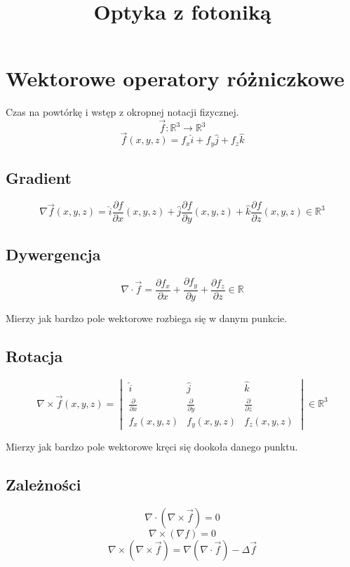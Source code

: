 \documentclass{../notatki}
\title{Optyka z fotoniką}
\begin{document}
\section{Wektorowe operatory różniczkowe}

Czas na powtórkę i wstęp z okropnej notacji fizycznej.
$$
\vec{f}: \mathbb{R}^3 \to \mathbb{R}^3
$$
$$
\vec{f}(x, y, z) = f_x \hat{i} + f_y \hat{j} + f_z \hat{k}
$$

\subsection{Gradient}

$$
\nabla \vec{f}(x, y, z) =
\hat{i} \frac{\partial f}{\partial x}(x, y,z) +
\hat{j} \frac{\partial f}{\partial y}(x, y, z) +
\hat{k} \frac{\partial f}{\partial z}(x, y, z)
\in \mathbb{R}^3
$$

\subsection{Dywergencja}

$$
\nabla \cdot \vec{f} = \frac{\partial f_x}{\partial x} + \frac{\partial
f_y}{\partial y} + \frac{\partial f_z}{\partial z}
\in \mathbb{R}
$$

Mierzy jak bardzo pole wektorowe rozbiega się w danym punkcie.

\subsection{Rotacja}

$$
\nabla \times \vec{f}(x, y, z) =
\begin{vmatrix}
  \hat{i} & \hat{j} & \hat{k} \\
  \frac{\partial}{\partial x} & \frac{\partial}{\partial y} &
  \frac{\partial}{\partial z} \\
  f_x(x, y, z) & f_y(x, y, z) & f_z(x, y, z)
\end{vmatrix}
\in \mathbb{R}^3
$$

Mierzy jak bardzo pole wektorowe kręci się dookoła danego punktu.

\subsection{Zależności}

$$
\nabla \cdot (\nabla \times \vec{f}) = 0
$$
$$
\nabla \times (\nabla f) = 0
$$
$$
\nabla \times (\nabla \times \vec{f}) = \nabla(\nabla \cdot \vec{f})
- \Delta \vec{f}
$$
\end{document}
